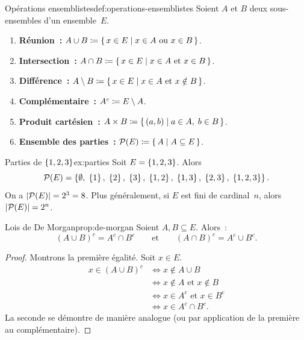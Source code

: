 \begin{definition}{Opérations ensemblistes}{def:operations-ensemblistes}
  Soient $A$ et $B$ deux sous-ensembles d'un ensemble~$E$.
  \begin{enumerate}[label=(\roman*)]
    \item \textbf{Réunion~:} $A\cup B \coloneqq \left\{\,x\in E\;\middle|\;x\in A\text{ ou }x\in B\,\right\}$.
    \item \textbf{Intersection~:} $A\cap B \coloneqq \left\{\,x\in E\;\middle|\;x\in A\text{ et }x\in B\,\right\}$.
    \item \textbf{Différence~:} $A\setminus B \coloneqq \left\{\,x\in E\;\middle|\;x\in A\text{ et }x\notin B\,\right\}$.
    \item \textbf{Complémentaire~:} $A^c \coloneqq E\setminus A$.
    \item \textbf{Produit cartésien~:} $A\times B \coloneqq \left\{\,(a,b)\;\middle|\;a\in A,\; b\in B\,\right\}$.
    \item \textbf{Ensemble des parties~:} $\mathcal{P}(E) \coloneqq \left\{\,A\;\middle|\;A\subseteq E\,\right\}$.
  \end{enumerate}
\end{definition}

\begin{example}{Parties de $\left\{1,2,3\right\}$}{ex:parties}
  Soit $E=\left\{1,2,3\right\}$. Alors
  \[
    \mathcal{P}(E)=\left\{\emptyset,\;\left\{1\right\},\;\left\{2\right\},\;\left\{3\right\},\;
    \left\{1,2\right\},\;\left\{1,3\right\},\;\left\{2,3\right\},\;\left\{1,2,3\right\}\right\}.
  \]
  On a $\left|\mathcal{P}(E)\right|=2^3=8$. Plus généralement, si $E$ est fini
  de cardinal~$n$, alors $\left|\mathcal{P}(E)\right|=2^n$.
\end{example}

\begin{proposition}{Lois de De Morgan}{prop:de-morgan}
  Soient $A,B\subseteq E$. Alors~:
  \[
    (A\cup B)^c = A^c \cap B^c
    \qquad\text{et}\qquad
    (A\cap B)^c = A^c \cup B^c.
  \]
\end{proposition}

\begin{proof}
  Montrons la première égalité. Soit $x\in E$.
  \begin{align*}
    x\in (A\cup B)^c
      &\iff x\notin A\cup B \\
      &\iff x\notin A \text{ et } x\notin B \\
      &\iff x\in A^c \text{ et } x\in B^c \\
      &\iff x\in A^c\cap B^c.
  \end{align*}
  La seconde se démontre de manière analogue (ou par application de la
  première au complémentaire).
\end{proof}


